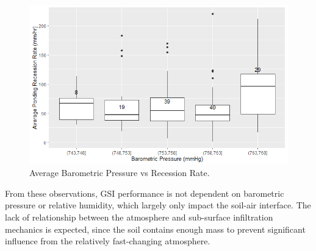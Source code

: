 \begin{figure}[ht]
	\centering
	\includegraphics[width=\textwidth]{gfx/chapter-data-analysis/pressure_vs_recession_rate_binned.png}
	\caption{Average Barometric Pressure vs Recession Rate.}
	\label{fig:recession-pressure-bin}
\end{figure}

From these observations, GSI performance is not dependent on barometric pressure or relative humidity, which largely only impact the soil-air interface.
The lack of relationship between the atmosphere and sub-surface infiltration mechanics is expected, since the soil contains enough mass to prevent significant influence from the relatively fast-changing atmosphere.

